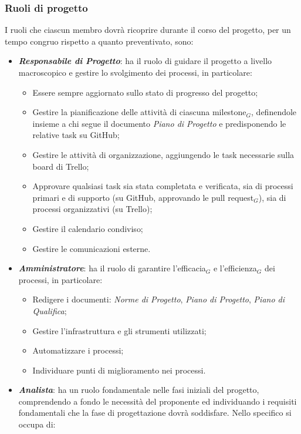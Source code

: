 \subsubsection{Ruoli di progetto}
I ruoli che ciascun membro dovrà ricoprire durante il corso del progetto, per un tempo congruo rispetto a quanto preventivato, sono:
\begin{itemize}
  \item \textbf{\textit{Responsabile di Progetto}}: ha il ruolo di guidare il progetto a livello macroscopico e gestire lo svolgimento dei processi, in particolare:
  \begin{itemize}
    \item Essere sempre aggiornato sullo stato di progresso del progetto;
    \item Gestire la pianificazione delle attività di ciascuna milestone$_G$, definendole insieme a chi segue il documento \textit{Piano di Progetto} e predisponendo le relative task su GitHub;
    \item Gestire le attività di organizzazione, aggiungendo le task necessarie sulla board di Trello;
    \item Approvare qualsiasi task sia stata completata e verificata, sia di processi primari e di supporto (su GitHub, approvando le pull request$_G$), sia di processi organizzativi (su Trello);
    \item Gestire il calendario condiviso;
    \item Gestire le comunicazioni esterne.
  \end{itemize}
  \item \textbf{\textit{Amministratore}}: ha il ruolo di garantire l'efficacia$_G$ e l'efficienza$_G$ dei processi, in particolare:
  \begin{itemize}
    \item Redigere i documenti: \textit{Norme di Progetto}, \textit{Piano di Progetto}, \textit{Piano di Qualifica};
    \item Gestire l'infrastruttura e gli strumenti utilizzati;
    \item Automatizzare i processi;
    \item Individuare punti di miglioramento nei processi.
  \end{itemize}
  \item \textbf{\textit{Analista}}: ha un ruolo fondamentale nelle fasi iniziali del progetto, comprendendo a fondo le necessità del proponente ed individuando i requisiti fondamentali che la fase di progettazione dovrà soddisfare. Nello specifico si occupa di:

\end{itemize}
